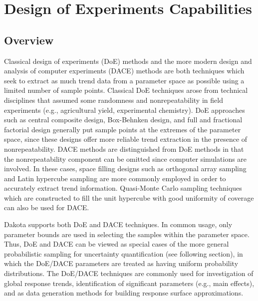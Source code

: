 \chapter{Design of Experiments Capabilities}\label{dace}

\section{Overview}\label{dace:overview}

Classical design of experiments (DoE) methods and the more modern
design and analysis of computer experiments (DACE) methods are both
techniques which seek to extract as much trend data from a parameter
space as possible using a limited number of sample points. Classical
DoE techniques arose from technical disciplines that assumed some
randomness and nonrepeatability in field experiments (e.g.,
agricultural yield, experimental chemistry). DoE approaches such as
central composite design, Box-Behnken design, and full and fractional
factorial design generally put sample points at the extremes of the
parameter space, since these designs offer more reliable trend
extraction in the presence of nonrepeatability. DACE methods are
distinguished from DoE methods in that the nonrepeatability component
can be omitted since computer simulations are involved. In these
cases, space filling designs such as orthogonal array sampling and
Latin hypercube sampling are more commonly employed in order to
accurately extract trend information. Quasi-Monte Carlo sampling
techniques which are constructed to fill the unit hypercube with good
uniformity of coverage can also be used for DACE.

Dakota supports both DoE and DACE techniques. In common usage, only
parameter bounds are used in selecting the samples within the
parameter space. Thus, DoE and DACE can be viewed as special cases of
the more general probabilistic sampling for uncertainty quantification
(see following section), in which the DoE/DACE parameters are treated
as having uniform probability distributions. The DoE/DACE techniques
are commonly used for investigation of global response trends,
identification of significant parameters (e.g., main effects), and as
data generation methods for building response surface approximations.

